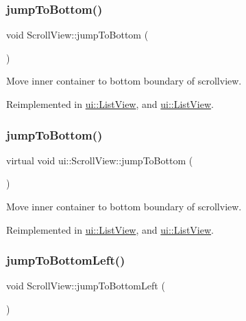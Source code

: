 \subsubsection{\texorpdfstring{jump\+To\+Bottom()}{jumpToBottom()}\hspace{0.1cm}{\footnotesize\ttfamily [1/2]}}
{\footnotesize\ttfamily void Scroll\+View\+::jump\+To\+Bottom (\begin{DoxyParamCaption}{ }\end{DoxyParamCaption})\hspace{0.3cm}{\ttfamily [virtual]}}

Move inner container to bottom boundary of scrollview. 

Reimplemented in \hyperlink{classui_1_1ListView_aeffa88663d344fbba91e24360458e207}{ui\+::\+List\+View}, and \hyperlink{classui_1_1ListView_a188c4b2a431157ef28ba92c26f1157cc}{ui\+::\+List\+View}.

\mbox{\label{classui_1_1ScrollView_aa395ac179eb47e58b4618829c4705892}} 
\subsubsection{\texorpdfstring{jump\+To\+Bottom()}{jumpToBottom()}\hspace{0.1cm}{\footnotesize\ttfamily [2/2]}}
{\footnotesize\ttfamily virtual void ui\+::\+Scroll\+View\+::jump\+To\+Bottom (\begin{DoxyParamCaption}{ }\end{DoxyParamCaption})\hspace{0.3cm}{\ttfamily [virtual]}}

Move inner container to bottom boundary of scrollview. 

Reimplemented in \hyperlink{classui_1_1ListView_aeffa88663d344fbba91e24360458e207}{ui\+::\+List\+View}, and \hyperlink{classui_1_1ListView_a188c4b2a431157ef28ba92c26f1157cc}{ui\+::\+List\+View}.

\mbox{\label{classui_1_1ScrollView_aa06afeba18463d129dfdc3a9352aaf4a}} 
\subsubsection{\texorpdfstring{jump\+To\+Bottom\+Left()}{jumpToBottomLeft()}\hspace{0.1cm}{\footnotesize\ttfamily [1/2]}}
{\footnotesize\ttfamily void Scroll\+View\+::jump\+To\+Bottom\+Left (\begin{DoxyParamCaption}{ }\end{DoxyParamCaption})\hspace{0.3cm}{\ttfamily [virtual]}}

